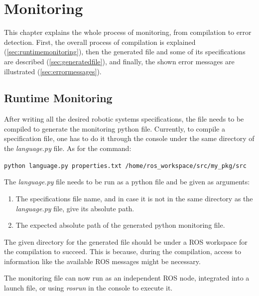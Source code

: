 \chapter{Monitoring}
\label{chap:monitoring}

This chapter explains the whole process of monitoring, from compilation to error detection. First, the overall process of compilation is explained (\autoref{sec:runtimemonitoring}), then the generated file and some of its specifications are described (\autoref{sec:generatedfile}), and finally, the shown error messages are illustrated (\autoref{sec:errormessages}).


\section{Runtime Monitoring}
\label{sec:runtimemonitoring}

After writing all the desired robotic systems specifications, the file needs to be compiled to generate the monitoring python file. Currently, to compile a specification file, one has to do it through the console under the same directory of the \textit{language.py} file. As for the command:

\texttt{python language.py properties.txt /home/ros\_workspace/src/my\_pkg/src}

The \textit{language.py} file needs to be run as a python file and be given as arguments:

\begin{enumerate}
    \item The specifications file name, and in case it is not in the same directory as the \textit{language.py} file, give its absolute path.
    \item The expected absolute path of the generated python monitoring file.
\end{enumerate}

The given directory for the generated file should be under a ROS workspace for the compilation to succeed. This is because, during the compilation, access to information like the available ROS messages might be necessary.

The monitoring file can now run as an independent ROS node, integrated into a launch file, or using \textit{rosrun} in the console to execute it.


